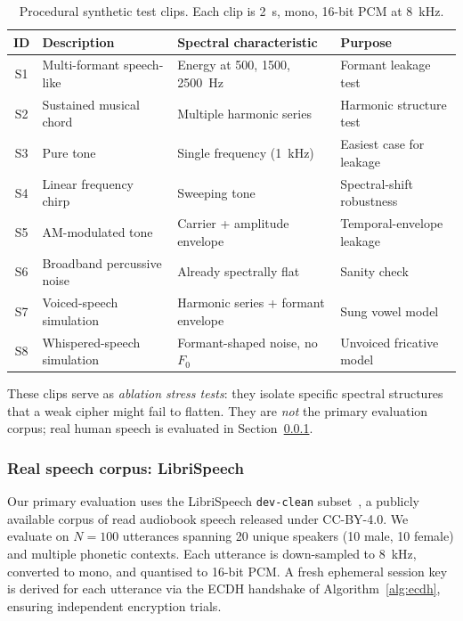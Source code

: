 \documentclass[pdflatex,sn-mathphys-num]{sn-jnl}%
\theoremstyle{thmstyleone}%
\theoremstyle{thmstyletwo}%
\theoremstyle{thmstylethree}%
\begin{document}
\begin{table}[t]
\centering
\caption{Procedural synthetic test clips. Each clip is 2~s, mono, 16-bit PCM at 8~kHz.}
\label{tab:synthetic_clips}
\begin{tabular}{@{}clp{5.5cm}l@{}}
\toprule
ID & Description & Spectral characteristic & Purpose \\
\midrule
S1 & Multi-formant speech-like & Energy at 500, 1500, 2500~Hz & Formant leakage test \\
S2 & Sustained musical chord & Multiple harmonic series & Harmonic structure test \\
S3 & Pure tone & Single frequency (1~kHz) & Easiest case for leakage \\
S4 & Linear frequency chirp & Sweeping tone & Spectral-shift robustness \\
S5 & AM-modulated tone & Carrier + amplitude envelope & Temporal-envelope leakage \\
S6 & Broadband percussive noise & Already spectrally flat & Sanity check \\
S7 & Voiced-speech simulation & Harmonic series + formant envelope & Sung vowel model \\
S8 & Whispered-speech simulation & Formant-shaped noise, no $F_0$ & Unvoiced fricative model \\
\bottomrule
\end{tabular}
\end{table}

These clips serve as \emph{ablation stress tests}: they isolate specific 
spectral structures that a weak cipher might fail to flatten. They are 
\emph{not} the primary evaluation corpus; real human speech is evaluated 
in Section~\ref{sec:real_speech}.

\subsubsection{Real speech corpus: LibriSpeech}
\label{sec:real_speech}
Our primary evaluation uses the LibriSpeech \texttt{dev-clean} 
subset~\cite{panayotov2015}, a publicly available corpus of read 
audiobook speech released under CC-BY-4.0. We evaluate on $N=100$ utterances 
spanning 20 unique speakers (10 male, 10 female) and multiple phonetic contexts. 
Each utterance is down-sampled to 8~kHz, converted to mono, and quantised to 
16-bit PCM. A fresh ephemeral session key is derived for each utterance via 
the ECDH handshake of Algorithm~\ref{alg:ecdh}, ensuring independent 
encryption trials.
\end{document}
